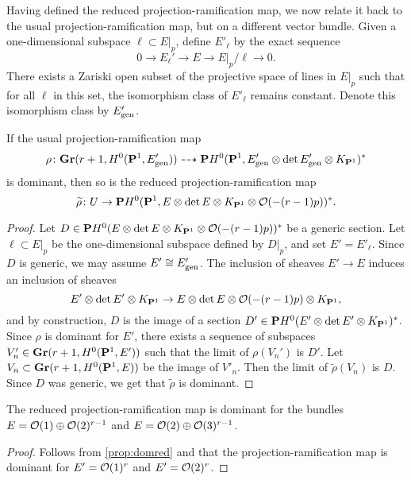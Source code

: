 Having defined the reduced projection-ramification map, we now relate it back to the usual projection-ramification map, but on a different vector bundle.
Given a one-dimensional subspace $\ell \subset E|_p$, define $E'_\ell$ by the exact sequence
\[ 0 \to E_\ell' \to E \to E|_p/\ell\to 0.\]
There exists a Zariski open subset of the projective space of lines in $E|_p$ such that for all $\ell$ in this set, the isomorphism class of $E'_{\ell}$ remains constant.
Denote this isomorphism class by $E'_{\rm gen}$.
\begin{proposition}\label{prop:domred}
  If the usual projection-ramification map
  \[ \rho \from \Gr(r+1, H^0(\P^1, E'_{\rm gen})) \dashrightarrow \P H^0(\P^1, E'_{\rm gen} \otimes \det E'_{\rm gen} \otimes K_{\P^1})^*\]
  is dominant, then so is the reduced projection-ramification map
  \[\widetilde \rho \from U \to \P H^0(\P^1, E \otimes \det E \otimes K_{\P^1} \otimes \O(-(r-1)p))^*.\]
\end{proposition}
\begin{proof}
  Let $D \in \P H^0(E \otimes \det E \otimes K_{\P^1} \otimes \O(-(r-1)p))^*$ be a generic section.
  Let $\ell \subset E|_p$ be the one-dimensional subspace defined by $D|_p$, and set $E' = E'_{\ell}$.
  Since $D$ is generic, we may assume $E' \cong E'_{\rm gen}$.
  The inclusion of sheaves $E' \to E$ induces an inclusion of sheaves
  \[
    E' \otimes \det E' \otimes K_{\P^1} \to E \otimes \det E \otimes \O(-(r-1)p) \otimes K_{\P^1},
  \]
  and by construction, $D$ is the image of a section $D' \in \P H^0(E' \otimes \det E' \otimes K_{\P^1})^*$.
  Since $\rho$ is dominant for $E'$, there exists a sequence of subspaces $V_n' \in \Gr(r+1, H^0(\P^1, E'))$ such that the limit of $\rho(V_n')$ is $D'$.
  Let $V_n \subset \Gr(r+1, H^0(\P^1, E))$ be the image of $V'_n$.
  Then the limit of $\widetilde \rho(V_n)$ is $D$.
  Since $D$ was generic, we get that $\widetilde \rho$ is dominant.
\end{proof}

\begin{corollary}\label{prop:domredexamples}
  The reduced projection-ramification map is dominant for the bundles $E = \O(1) \oplus \O(2)^{r-1}$ and $E = \O(2) \oplus \O(3)^{r-1}$.
\end{corollary}
\begin{proof}
  Follows from \autoref{prop:domred} and that the projection-ramification map is dominant for $E' = \O(1)^r$ and $E' = \O(2)^r$.
\end{proof}

